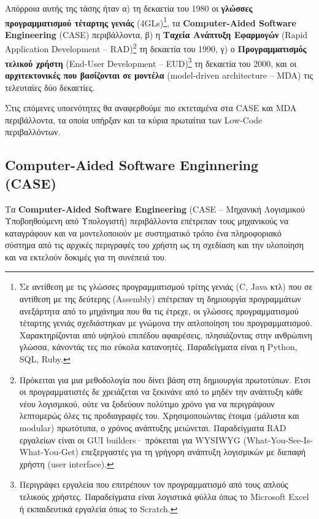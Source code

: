         Απόρροια αυτής της τάσης ήταν α) τη δεκαετία του 1980 οι \textbf{γλώσσες προγραμματισμού τέταρτης γενιάς} (4GLs)\footnote{Σε αντίθεση με τις γλώσσες προγραμματισμού τρίτης γενιάς (C, Java κτλ) που σε αντίθεση με της δεύτερης (Assembly) επέτρεπαν τη δημιουργία προγραμμάτων ανεξάρτητα από το μηχάνημα που θα τις έτρεχε, οι γλώσσες προγραμματισμού τέταρτης γενιάς σχεδιάστηκαν με γνώμονα την απλοποίηση του προγραμματισμού. Χαρακτηρίζονται από υψηλού επιπέδου αφαιρέσεις, πλησιάζοντας στην ανθρώπινη γλώσσα, κάνοντάς τες πιο εύκολα κατανοητές. Παραδείγματα είναι η Python, SQL, Ruby.}, τα \textbf{Computer-Aided Software Engineering} (CASE) περιβάλλοντα, β) η \textbf{Ταχεία Ανάπτυξη Εφαρμογών} (Rapid Application Development -- RAD)\footnote{Πρόκειται για μια μεθοδολογία που δίνει βάση στη δημιουργία πρωτοτύπων. Έτσι οι προγραμματιστές δε χρειάζεται να ξεκινάνε από το μηδέν την ανάπτυξη κάθε νέου λογισμικού, ούτε να ξοδεύουν πολύτιμο χρόνο για να περιγράψουν λεπτομερώς όλες τις προδιαγραφές του. Χρησιμοποιώντας έτοιμα (μάλιστα και modular) πρωτότυπα, ο χρόνος ανάπτυξης μειώνεται. Παραδείγματα RAD εργαλείων είναι οι GUI builders· πρόκειται για WYSIWYG (What-You-See-Is-What-You-Get) επεξεργαστές για τη γρήγορη ανάπτυξη λογισμικών με διεπαφή χρήστη (user interface).} τη δεκαετία του 1990, γ) ο \textbf{Προγραμματισμός τελικού χρήστη} (End-User Development -- EUD)\footnote{Περιγράφει εργαλεία που επιτρέπουν τον προγραμματισμό από τους απλούς τελικούς χρήστες. Παραδείγματα είναι λογιστικά φύλλα όπως το Microsoft Excel ή εκπαιδευτικά εργαλεία όπως το Scratch.} τη δεκαετία του 2000, και οι \textbf{αρχιτεκτονικές που βασίζονται σε μοντέλα} (model-driven architecture -- MDA) τις τελευταίες δύο δεκαετίες. \cite{Case1985, CASEChikofsky, MDELow}

        Στις επόμενες υποενότητες θα αναφερθούμε πιο εκτεταμένα στα CASE και MDA περιβάλλοντα, τα οποία υπήρξαν και τα κύρια πρωταίτια των Low-Code περιβαλλόντων.

        \subsection{Computer-Aided Software Enginnering (CASE)}
            Τα \textbf{Computer-Aided Software Engineering} (CASE -- Μηχανική Λογισμικού Υποβοηθούμενη από Υπολογιστή) περιβάλλοντα επέτρεπαν τους μηχανικούς να καταγράφουν και να μοντελοποιούν με συστηματικό τρόπο ένα πληροφοριακό σύστημα από τις αρχικές περιγραφές του χρήστη ως τη σχεδίαση και την υλοποίηση και να εκτελούν δοκιμές για τη συνέπειά του.

